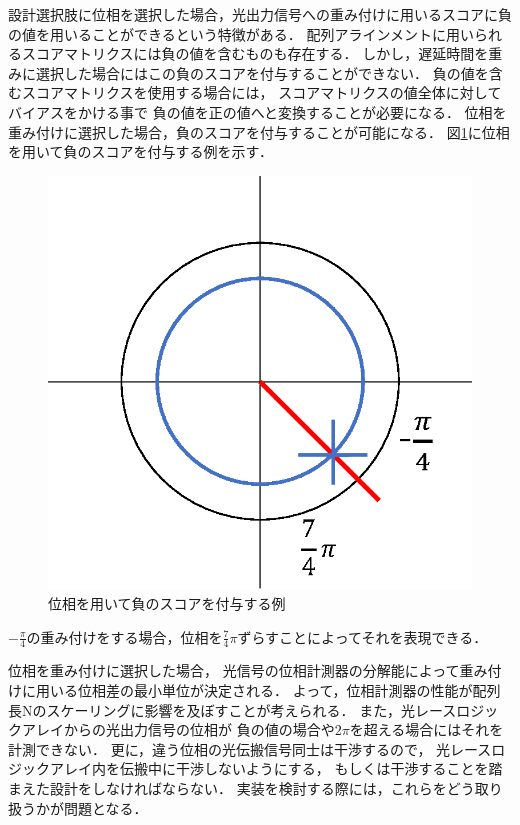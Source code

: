 設計選択肢に位相を選択した場合，光出力信号への重み付けに用いるスコアに負の値を用いることができるという特徴がある．
配列アラインメントに用いられるスコアマトリクスには負の値を含むものも存在する．
しかし，遅延時間を重みに選択した場合にはこの負のスコアを付与することができない．
負の値を含むスコアマトリクスを使用する場合には，
スコアマトリクスの値全体に対してバイアスをかける事で
負の値を正の値へと変換することが必要になる．
位相を重み付けに選択した場合，負のスコアを付与することが可能になる．
図\ref{fig:isou}に位相を用いて負のスコアを付与する例を示す．
\begin{figure}[t!]
\begin{center}
\includegraphics[keepaspectratio,scale=0.5]{fig/5/isou.eps}
\caption{位相を用いて負のスコアを付与する例}
\label{fig:isou}
\end{center}
\end{figure}
$-\frac{\pi}{4}$の重み付けをする場合，位相を$\frac{7}{4}\pi$ずらすことによってそれを表現できる．

位相を重み付けに選択した場合，
光信号の位相計測器の分解能によって重み付けに用いる位相差の最小単位が決定される．
よって，位相計測器の性能が配列長Nのスケーリングに影響を及ぼすことが考えられる．
また，光レースロジックアレイからの光出力信号の位相が
負の値の場合や$2\pi$を超える場合にはそれを計測できない．
更に，違う位相の光伝搬信号同士は干渉するので，
光レースロジックアレイ内を伝搬中に干渉しないようにする，
もしくは干渉することを踏まえた設計をしなければならない．
実装を検討する際には，これらをどう取り扱うかが問題となる．

